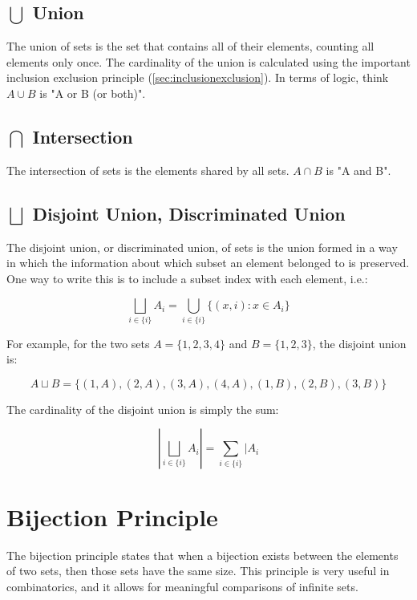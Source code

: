 \subsection{$\bigcup$ Union}
The union of sets is the set that contains all of their elements, counting all elements only once. The cardinality of the union is calculated using the important inclusion exclusion principle (\ref{sec:inclusionexclusion}). In terms of logic, think $A\cup B$ is "A or B (or both)".

\subsection{$\bigcap$ Intersection}
The intersection of sets is the elements shared by all sets. $A\cap B$ is "A and B".

\subsection{$\bigsqcup$ Disjoint Union, Discriminated Union}
The disjoint union, or discriminated union, of sets is the union formed in a way in which the information about which subset an element belonged to is preserved. One way to write this is to include a subset index with each element, i.e.:

\begin{equation}
\bigsqcup_{i\in\{i\}}A_i = \bigcup_{i\in\{i\}} \{(x,i): x\in A_i\}
\end{equation}

For example, for the two sets $A=\{1,2,3,4\}$ and $B=\{1,2,3\}$, the disjoint union is:

\begin{equation}
A\sqcup B = \{(1,A),(2,A),(3,A),(4,A),(1,B),(2,B),(3,B)\}
\end{equation}

The cardinality of the disjoint union is simply the sum:

\begin{equation}
\left|\bigsqcup_{i\in\{i\}}A_i\right| = \sum_{i\in\{i\}}|A_i
\end{equation}



\section{Bijection Principle}
The bijection principle states that when a bijection exists between the elements of two sets, then those sets have the same size. This principle is very useful in combinatorics, and it allows for meaningful comparisons of infinite sets.


